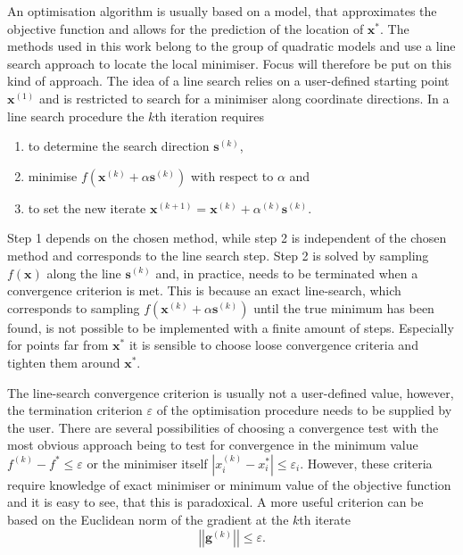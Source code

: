 An optimisation algorithm is usually based on a model, that approximates the
objective function and allows for the prediction of the location of
$\mathbf{x^*}$. The methods used in this work belong to the group of quadratic
models and use a line search approach to locate the local minimiser. Focus will
therefore be put on this kind of approach. The idea of a line search relies on
a user-defined starting point $\mathbf{x}^{(1)}$ and is restricted to search
for a minimiser along coordinate directions. In a line search procedure the
$k$th iteration requires 
\begin{enumerate}
        \item to determine the search direction $\mathbf{s}^{(k)}$, 
        \item minimise $f\left(\mathbf{x}^{(k)}+\alpha\mathbf{s}^{(k)}\right)$ with respect to $\alpha$ and 
        \item to set the new iterate $\mathbf{x}^{(k+1)}=\mathbf{x}^{(k)}+\alpha^{(k)}\mathbf{s}^{(k)}$.
\end{enumerate}            
Step 1 depends on the chosen method, while step 2 is independent of the chosen
method and corresponds to the line search step. Step 2 is solved by sampling
$f(\mathbf{x})$ along the line $\mathbf{s}^{(k)}$ and, in practice, needs to be
terminated when a convergence criterion is met. This is because an exact
line-search, which corresponds to sampling
$f\left(\mathbf{x}^{(k)}+\alpha\mathbf{s}^{(k)}\right)$ until the true minimum
has been found, is not possible to be implemented with a finite amount of
steps.  Especially for points far from $\mathbf{x^*}$ it is sensible to choose
loose convergence criteria and tighten them around $\mathbf{x^*}$.

The line-search convergence criterion is usually not a user-defined value,
however, the termination criterion $\varepsilon$ of the optimisation procedure
needs to be supplied by the user. There are several possibilities of choosing a
convergence test with the most obvious approach being to test for convergence
in the minimum value $f^{(k)}-f^*\leq\varepsilon$ or the minimiser itself
$\left|x^{(k)}_i-x^*_i\right|\leq\varepsilon_i$. However, these criteria
require knowledge of exact minimiser or minimum value of the objective function
and it is easy to see, that this is paradoxical. A more useful criterion can be
based on the Euclidean norm of the gradient at the $k$th iterate
%
\begin{equation}
    \left|\left|\mathbf{g}^{(k)}\right|\right|\leq \varepsilon.
\end{equation}
%

